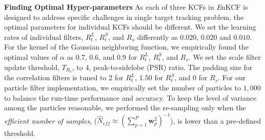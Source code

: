 \documentclass[10pt,twocolumn,letterpaper]{article}
\begin{document}
\textbf{Finding Optimal Hyper-parameters} As each of three KCFs in
       {\it E}nKCF is designed to address specific challenges in
       single target tracking problem, the optimal parameters for
       individual KCFs should be different. We set the learning rates
       of individual filters, $R_{t}^{L}$, $R_{t}^{S}$, and $R_{s}$
       differently as $0.020$, $0.020$ and $0.010$. For the kernel of
       the Gaussian neighboring function, we empirically found the
       optimal values of $\alpha$ as $0.7$, $0.6$, and $0.9$ for
       $R_{t}^{L}$, $R_{t}^{S}$, and $R_{s}$. We set the scale filter
       update threshold, $T_{R_{s}}$, to 4, peak-to-sidelobe (PSR)
       ratio. The padding size for the correlation filters is tuned to
       $2$ for $R_{t}^{L}$, $1.50$ for $R_{t}^{S}$, and $0$ for
       $R_{s}$. For our particle filter implementation, we empirically
       set the number of particles to $1,000$ to balance the run-time
       performance and accuracy. To keep the level of variance among
       the particles reasonable, we performed the re-sampling only
       when the \textit{efficient number of samples}, ($ \hat{N}_{eff}
       \approx (\sum_{p=1}^{P}\mathbf{w}_{p}^{2})^{-1} $), is lower than a
       pre-defined threshold.
\end{document}
